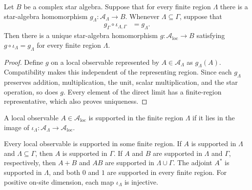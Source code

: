 \begin{lemma}
    \label{thm:qca_algebraic_local_algebra_universal}
    \leanok
    Let $B$ be a complex star algebra.  Suppose that for every finite region
    $\Lambda$ there is a star-algebra homomorphism
    $g_\Lambda\colon\mathcal A_\Lambda\to B$.  Whenever
    $\Lambda\subseteq\Gamma$, suppose that
    \begin{align}
        g_\Gamma\circ\iota_{\Lambda,\Gamma} & =g_\Lambda.
    \end{align}
    Then there is a unique star-algebra homomorphism
    $g\colon\mathcal A_{\mathrm{loc}}\to B$ satisfying
    $g\circ\iota_\Lambda=g_\Lambda$ for every finite region $\Lambda$.
\end{lemma}

\begin{proof}\leanok
    Define $g$ on a local observable represented by
    $A\in\mathcal A_\Lambda$ as $g_\Lambda(A)$.  Compatibility makes this
    independent of the representing region.  Since each $g_\Lambda$ preserves
    addition, multiplication, the unit, scalar multiplication, and the star
    operation, so does $g$.  Every element of the direct limit has a
    finite-region representative, which also proves uniqueness.
\end{proof}

\begin{definition}
    \label{def:qca_supported_in}
    \leanok
    A local observable $A\in\mathcal A_{\mathrm{loc}}$ is supported in the
    finite region $\Lambda$ if it lies in the image of
    $\iota_\Lambda\colon\mathcal A_\Lambda\to\mathcal A_{\mathrm{loc}}$.
\end{definition}

\begin{lemma}
    \label{thm:qca_local_observable_finite_support}
    \leanok
    Every local observable is supported in some finite region.  If $A$ is
    supported in $\Lambda$ and $\Lambda\subseteq\Gamma$, then $A$ is supported
    in $\Gamma$.  If $A$ and $B$ are supported in $\Lambda$ and $\Gamma$,
    respectively, then $A+B$ and $AB$ are supported in $\Lambda\cup\Gamma$.
    The adjoint $A^*$ is supported in $\Lambda$, and both $0$ and $1$ are
    supported in every finite region.  For positive on-site dimension, each
    map $\iota_\Lambda$ is injective.
\end{lemma}

